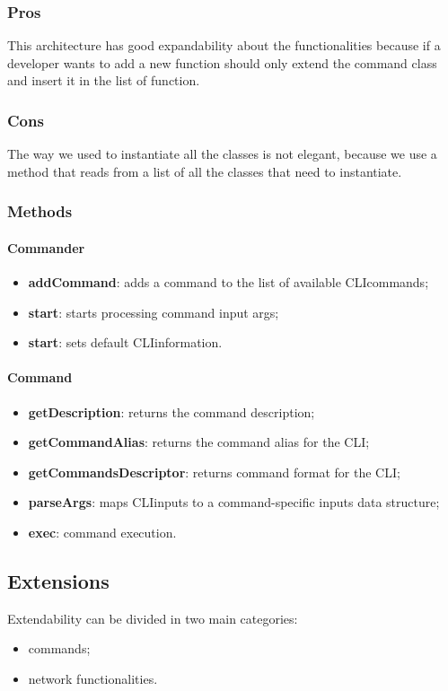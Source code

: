 \subsubsection{Pros}
This architecture has good expandability about the functionalities because if a developer wants to add a new function should only extend the command class and insert it in the list of function.
\subsubsection{Cons}
The way we used to instantiate all the classes is not elegant, because we use a method that reads from a list of all the classes that need to instantiate.

\subsubsection{Methods}
\paragraph{Commander}
\begin{itemize}
    \item \textbf{addCommand}: adds a command to the list of available CLI\glo commands;
    \item \textbf{start}: starts processing command input args;
    \item \textbf{start}: sets default CLI\glo information.
\end{itemize}
\paragraph{Command}
\begin{itemize}
    \item \textbf{getDescription}: returns the command description;
    \item \textbf{getCommandAlias}: returns the command alias for the CLI\glo;
    \item \textbf{getCommandsDescriptor}: returns command format for the CLI\glo;
    \item \textbf{parseArgs}: maps CLI\glo inputs to a command-specific inputs data structure;
    \item \textbf{exec}: command execution.
\end{itemize}
\subsection{Extensions}
Extendability can be divided in two main categories:
\begin{itemize}
	\item commands;
	\item network functionalities.
\end{itemize}
